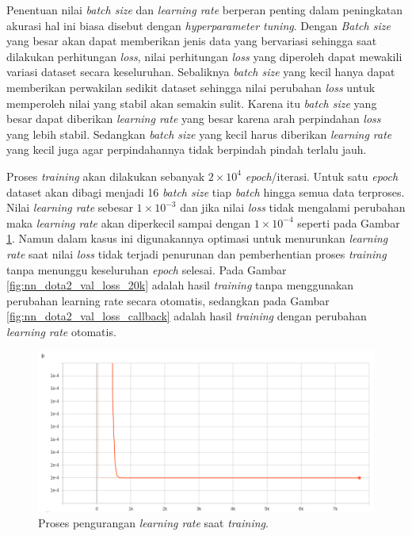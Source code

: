 Penentuan nilai \textit{batch size} dan \textit{learning rate} berperan penting dalam peningkatan akurasi hal ini biasa disebut dengan \textit{hyperparameter tuning}. Dengan \textit{Batch size} yang besar akan dapat memberikan jenis data yang bervariasi sehingga saat dilakukan perhitungan \textit{loss}, nilai perhitungan \textit{loss} yang diperoleh dapat mewakili variasi dataset secara keseluruhan. Sebaliknya \textit{batch size} yang kecil hanya dapat memberikan perwakilan sedikit dataset sehingga nilai perubahan \textit{loss} untuk memperoleh nilai yang stabil akan semakin sulit. Karena itu \textit{batch size} yang besar dapat diberikan \textit{learning rate} yang besar karena arah perpindahan \textit{loss} yang lebih stabil. Sedangkan \textit{batch size} yang kecil harus diberikan \textit{learning rate} yang kecil juga agar perpindahannya tidak berpindah pindah terlalu jauh.
\vspace{1ex}

Proses \textit{training} akan dilakukan sebanyak $2 \times 10^{4}$ \textit{epoch}/iterasi. Untuk satu \textit{epoch} dataset akan dibagi menjadi 16 \textit{batch size} tiap \textit{batch} hingga semua data terproses. Nilai \textit{learning rate} sebesar $1 \times 10^{-3}$ dan jika nilai \textit{loss} tidak mengalami perubahan maka \textit{learning rate} akan diperkecil sampai dengan $1 \times 10^{-4}$ seperti pada Gambar \ref{fig:nn_dota2_lr}. Namun dalam kasus ini digunakannya optimasi untuk menurunkan \textit{learning rate} saat nilai \textit{loss} tidak terjadi penurunan dan pemberhentian proses \textit{training} tanpa menunggu keseluruhan \textit{epoch} selesai. Pada Gambar \ref{fig:nn_dota2_val_loss_20k} adalah hasil \textit{training} tanpa menggunakan perubahan learning rate secara otomatis, sedangkan pada Gambar \ref{fig:nn_dota2_val_loss_callback} adalah hasil \textit{training} dengan perubahan \textit{learning rate} otomatis.

\begin{figure} [!htb] \centering
	\includegraphics[scale=0.4]{img/callback_lr_chap3.png}
	\caption{Proses pengurangan \textit{learning rate} saat \textit{training}.}
	\label{fig:nn_dota2_lr}
\end{figure}

